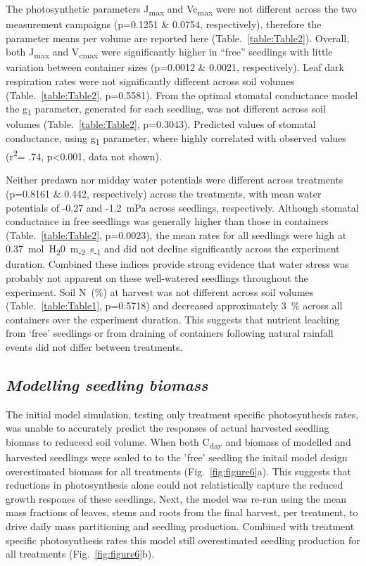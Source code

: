 \documentclass[a4paper]{article}\usepackage[]{graphicx}\usepackage[]{color}
\begin{document}
The photosynthetic parameters J\textsubscript{max} and Vc\textsubscript{max} were not different across the two measurement campaigns (p=0.1251 \& 0.0754, respectively), therefore the parameter means per volume are reported here (Table.~\ref{table:Table2}).  Overall, both J\textsubscript{max} and V\textsubscript{cmax} were significantly higher in “free” seedlings with little variation between container sizes (p=0.0012 \& 0.0021, respectively). Leaf dark respiration rates were not significantly different across soil volumes (Table.~\ref{table:Table2}, p=0.5581). From the \citet{medlyn2012reconciling} optimal stomatal conductance model the g\textsubscript{1} parameter, generated for each seedling, was not different across soil volumes (Table.~\ref{table:Table2}, p=0.3043). Predicted values of stomatal conductance, using g\textsubscript{1} parameter, where highly correlated with observed values (r\textsuperscript{2}= .74, p\textless0.001, data not shown).

Neither predawn nor midday water potentials were different across treatments (p=0.8161 \& 0.442, respectively) across the treatments, with mean water potentials of -0.27 and -1.2~mPa across seedlings, respectively. Although stomatal conductance in free seedlings was generally higher than those in containers (Table.~\ref{table:Table2}, p=0.0023), the mean rates for all seedlings were high at 0.37~mol~H\textsubscript{2}0~m\textsubscript{-2}~s\textsubscript{-1} and did not decline significantly across the experiment duration. Combined these indices provide strong evidence that water stress was probably not apparent on these well-watered seedlings throughout the experiment. Soil N~(\%) at harvest was not different across soil volumes (Table.~\ref{table:Table1}, p=0.5718) and decreased approximately 3~\% across all containers over the experiment duration. This suggests that nutrient leaching from ‘free’ seedlings or from draining of containers following natural rainfall events did not differ between treatments. 

\subsection*{\textit{Modelling seedling biomass}}
The initial model simulation, testing only treatment specific photosynthesis rates, was unable to accurately predict the responses of actual harvested seedling biomass to reducecd soil volume.  When both C\textsubscript{day} and biomass of modelled and harvested seedlings were scaled to to the 'free' seedling the initail model design overestimated biomass for all treatments (Fig.~\ref{fig:figure6}a).  This suggests that reductions in photosynthesis alone could not relatistically capture the reduced growth respones of these seedlings.  Next, the model was re-run using the mean mass fractions of leaves, stems and roots from the final harvest, per treatment, to drive daily mass partitioning and seedling production.  Combined with treatment specific photosynthesis rates this model still overestimated seedling production for all treatments (Fig.~\ref{fig:figure6}b).  
\end{document}
